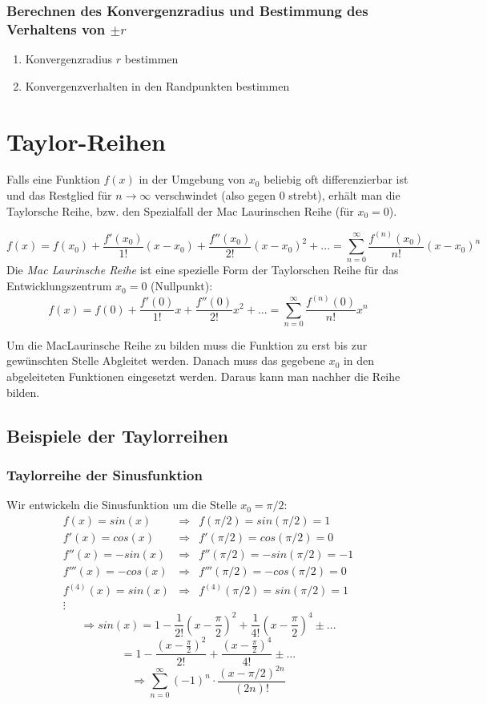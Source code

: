 \subsubsection*{Berechnen des Konvergenzradius und Bestimmung des Verhaltens von $\pm r$}
\begin{enumerate}
	\item Konvergenzradius $r$ bestimmen
	\item Konvergenzverhalten in den Randpunkten bestimmen
\end{enumerate}

\section{Taylor-Reihen}
Falls eine Funktion $f(x)$ in der Umgebung von $x_0$ beliebig oft differenzierbar ist und das Restglied für $n \rightarrow \infty$ verschwindet (also gegen 0 strebt), erhält man die Taylorsche Reihe, bzw. den Spezialfall der Mac Laurinschen Reihe (für $x_0 = 0$).

\begin{formel}
$$f(x) = f(x_0) + \frac{f'(x_0)}{1!}(x-x_0) + \frac{f''(x_0)}{2!}(x-x_0)^2 + ... = \sum\limits_{n=0}^{\infty} \frac{f^{(n)}(x_0)}{n!}(x - x_0)^n$$
Die \textit{Mac Laurinsche Reihe} ist eine spezielle Form der Taylorschen Reihe für das Entwicklungszentrum $x_0 = 0$ (Nullpunkt):
$$f(x) = f(0) + \frac{f'(0)}{1!}x + \frac{f''(0)}{2!}x^2 + ... = \sum\limits_{n=0}^{\infty} \frac{f^{(n)}(0)}{n!}x^n$$
\end{formel}
Um die MacLaurinsche Reihe zu bilden muss die Funktion zu erst bis zur gewünschten Stelle Abgleitet werden. Danach muss das gegebene $x_0$ in den abgeleiteten Funktionen eingesetzt werden. Daraus kann man nachher die Reihe bilden.

\subsection{Beispiele der Taylorreihen}
\subsubsection*{Taylorreihe der Sinusfunktion}
Wir entwickeln die Sinusfunktion um die Stelle $x_0 = \pi / 2$:
\begin{align*}
	f(x) = sin(x) 			&\Rightarrow & f(\pi / 2) 		= sin(\pi / 2) = 1 	\\
	f'(x) = cos(x)			&\Rightarrow & f'(\pi / 2) 		= cos(\pi / 2) = 0 	\\
	f''(x) = -sin(x)		&\Rightarrow & f''(\pi / 2) 			= -sin(\pi / 2) = -1	\\
	f'''(x) = -cos(x)		&\Rightarrow & f'''(\pi / 2) 		= -cos(\pi / 2) = 0	\\
	f^{(4)}(x) = sin(x)	&\Rightarrow & f^{(4)}(\pi / 2) 	= sin(\pi / 2) = 1		\\
	\vdots
\end{align*}
$$\Rightarrow  sin(x) = 1 - \frac{1}{2!}\left(x-\frac{\pi}{2}\right)^2 + \frac{1}{4!}\left(x-\frac{\pi}{2}\right)^4 \pm ...$$
$$ = 1 - \frac{\left(x-\frac{\pi}{2}\right)^2}{2!} + \frac{\left(x-\frac{\pi}{2}\right)^4}{4!} \pm ...$$
$$\Rightarrow  \sum\limits_{n=0}^{\infty} (-1)^n \cdot \frac{(x-\pi / 2)^{2n}}{(2n)!}$$

